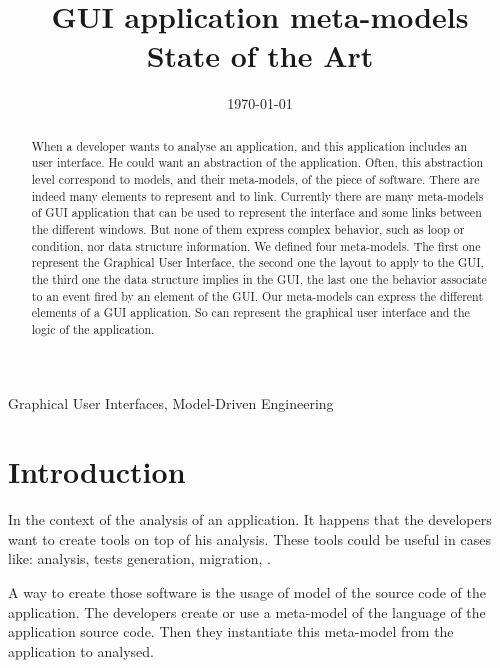 \documentclass[conference]{IEEEtran}
\author{
    \IEEEauthorblockN{Beno\^{i}t Verhaeghe$^{1,2}$, Anne Etien$^1$,\\ Nicolas Anquetil$^1$, St\'{e}phane Ducasse$^1$}\IEEEauthorblockA{$^1$Universit\'{e} de Lille, CNRS, Inria, \\ Centrale Lille, UMR 9189 -- CRIStAL, France\\}
    \and
    \IEEEauthorblockN{Abderrahmane Seriai$^2$, Laurent Deruelle$^2$,\\ Mustapha Derras$^2$}\IEEEauthorblockA{$^2$Berger-Levrault, France}     
}
\begin{document}
\title{GUI application meta-models\\ State of the Art}


\date{\today}
\maketitle



\begin{abstract}

When a developer wants to analyse an application,
    and this application includes an user interface.
He could want an abstraction of the application.
Often, this abstraction level correspond to models, and their meta-models, of
    the piece of software.
There are indeed many elements to represent and to link.
Currently there are many meta-models of GUI application
    that can be used to represent the interface
    and some links between the different windows.
But none of them express complex behavior, such as loop or condition,
    nor data structure information.
We defined four meta-models.
The first one represent the Graphical User Interface,
    the second one the layout to apply to the GUI, 
    the third one the data structure implies in the GUI, 
    the last one the behavior associate to an event fired by an element of the GUI. 
Our meta-models can express the different elements of a GUI application.
So can represent the graphical user interface
    and the logic of the application.

   
\end{abstract}

\begin{IEEEkeywords}
    Graphical User Interfaces, Model-Driven Engineering
\end{IEEEkeywords}

\section{Introduction}
\label{sec:intro}

 
In the context of the analysis of an application.
It happens that the developers want to create tools on top of his analysis.
These tools could be useful in cases like:
    analysis, tests generation, migration, \etc.

A way to create those software is the usage of model of the source code of the application.
The developers create or use a meta-model of the language of the application source code.
Then they instantiate this meta-model from the application to analysed.
\end{document}
